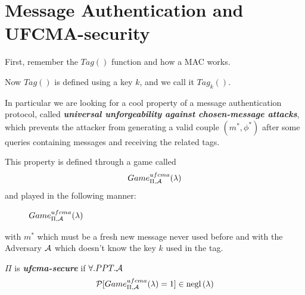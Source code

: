
\section{Message Authentication and UFCMA-security}

First, remember the $Tag()$ function and how a MAC works.

Now $Tag()$ is defined using a key $k$, and we call it $Tag_{k}()$.

In particular we are looking for a cool property of a message authentication protocol, called \textbf{ \textit{universal unforgeability against chosen-message attacks}}, which prevents the attacker from generating a valid couple $(m^{*}, \phi^{*})$ after some queries containing messages and receiving the related tags.

This property is defined through a game called 
\[
    Game_{\Pi, \mathcal{A}}^{ufcma}(\lambda)
\]
and played in the following manner:

\begin{figure}[h!]
   \centering
   \sdinit{}
   \caption{$Game_{\Pi, \mathcal{A}}^{ufcma}(\lambda)$}
\end{figure}

with $m^{*}$ which must be a fresh new message never used before and with the Adversary $\mathcal{A}$ which doesn't know the key $k$ used in the tag.

\begin{definition}
    $\Pi$ is \textbf{ \textit{ufcma-secure} } if $ \forall.PPT.\mathcal{A}$ 
    \[
        \mathcal{P} [ Game_{\Pi, \mathcal{A}}^{ufcma}(\lambda)=1 ] \in \mathrm{negl}\left({\lambda}\right)  
    \]
\end{definition}

